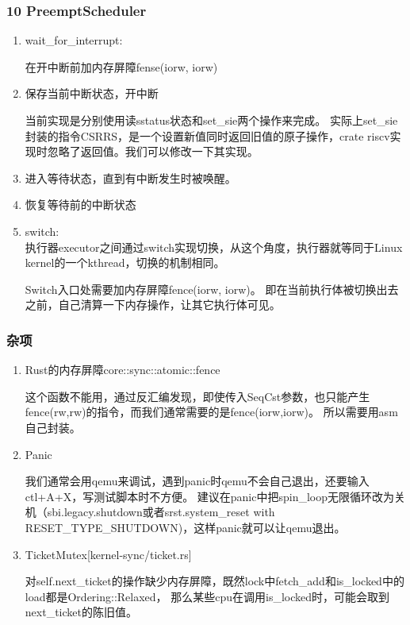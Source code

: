 \documentclass[
8pt, %
]{beamer}
\begin{document}
	\begin{frame}
		\frametitle{10 PreemptScheduler}
		\begin{enumerate}
			\item wait\_for\_interrupt:\\
			\begin{block}{}
				在开中断前加内存屏障fense(iorw, iorw)
			\end{block}
			\item 保存当前中断状态，开中断
			\begin{block}{}
				当前实现是分别使用读sstatus状态和set\_sie两个操作来完成。
				实际上set\_sie封装的指令CSRRS，是一个设置新值同时返回旧值的原子操作，crate riscv实现时忽略了返回值。我们可以修改一下其实现。
			\end{block}
			\item 进入等待状态，直到有中断发生时被唤醒。
			\item 恢复等待前的中断状态
			\item switch:\\
			执行器executor之间通过switch实现切换，从这个角度，执行器就等同于Linux kernel的一个kthread，切换的机制相同。
			\begin{block}{}
				Switch入口处需要加内存屏障fence(iorw, iorw)。
				即在当前执行体被切换出去之前，自己清算一下内存操作，让其它执行体可见。
			\end{block}
		\end{enumerate}
	\end{frame}

	\begin{frame}
		\frametitle{杂项}
		\begin{enumerate}
			\item Rust的内存屏障core::sync::atomic::fence\\
			\begin{block}{}
				这个函数不能用，通过反汇编发现，即使传入SeqCst参数，也只能产生fence(rw,rw)的指令，而我们通常需要的是fence(iorw,iorw)。
				所以需要用asm自己封装。
			\end{block}
			\item Panic\\
			\begin{block}{}
				我们通常会用qemu来调试，遇到panic时qemu不会自己退出，还要输入ctl+A+X，写测试脚本时不方便。
				建议在panic中把spin\_loop无限循环改为关机（sbi.legacy.shutdown或者srst.system\_reset with RESET\_TYPE\_SHUTDOWN)，这样panic就可以让qemu退出。
			\end{block}
			\item TicketMutex[kernel-sync/ticket.rs]
			\begin{block}{}
				对self.next\_ticket的操作缺少内存屏障，既然lock中fetch\_add和is\_locked中的load都是Ordering::Relaxed，
				那么某些cpu在调用is\_locked时，可能会取到next\_ticket的陈旧值。
			\end{block}
		\end{enumerate}
	\end{frame}
\end{document}
